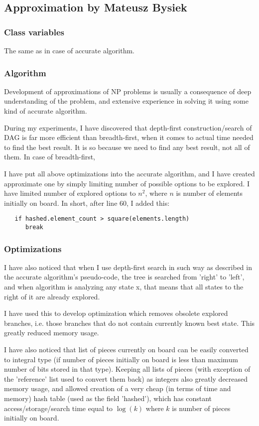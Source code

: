 \subsection{Approximation by Mateusz Bysiek}

\subsubsection{Class variables}
The same as in case of accurate algorithm.

\subsubsection{Algorithm}
Development of approximations of NP problems is usually a consequence 
of deep understanding of the problem, and extensive experience in solving it using
some kind of accurate algorithm.

During my experiments, I have discovered that depth-first construction/search of DAG is far more
efficient than breadth-first, when it comes to actual time needed to find the best result. It is so
because we need to find any best result, not all of them. In case of breadth-first, 

I have put all above optimizations into the accurate algorithm, and I have created approximate one
by simply limiting number of possible options to be explored. I have limited number of explored
options to $n^2$, where $n$ is number of elements initially on board. In short, after line 60, I
added this:

\begin{verbatim}
   if hashed.element_count > square(elements.length)
      break
\end{verbatim}

\subsubsection{Optimizations}
I have also noticed that when I use depth-first search in such way as described in the accurate
algorithm's pseudo-code, the tree is searched from 'right' to 'left', and when algorithm is
analyzing any state x, that means that all states to the right of it are already explored.

I have used this to develop optimization which removes obsolete explored branches, i.e. those
branches that do not contain currently known best state. This greatly reduced memory usage.

I have also noticed that list of pieces currently on board can be easily converted to integral type
(if number of pieces initially on board is less than maximum number of bits stored in that type).
Keeping all lists of pieces (with exception of the 'reference' list used to convert them back) as
integers also greatly decreased memory usage, and allowed creation of a very cheap (in terms of time
and memory) hash table (used as the field 'hashed'), which has constant access/storage/search time
equal to $\log (k)$ where $k$ is number of pieces initially on board.

